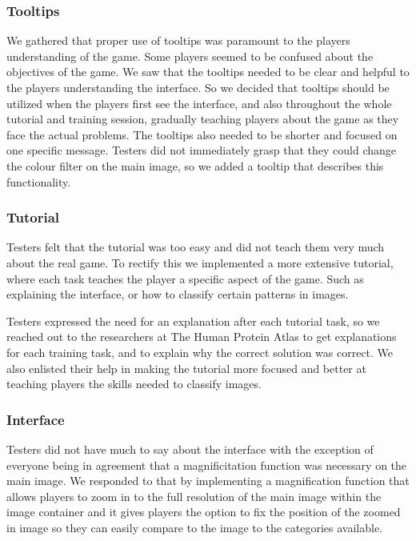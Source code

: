 \subsubsection{Tooltips}
We gathered that proper use of tooltips was paramount to the players understanding of the game. Some players seemed to be confused about the objectives of the game. We saw that the tooltips needed to be clear and helpful to the players understanding the interface. So we decided that tooltips should be utilized when the players first see the interface, and also throughout the whole tutorial and training session, gradually teaching players about the game as they face the actual problems. The tooltips also needed to be shorter and focused on one specific message. Testers did not immediately grasp that they could change the colour filter on the main image, so we added a tooltip that describes this functionality.

\subsubsection{Tutorial}
Testers felt that the tutorial was too easy and did not teach them very much about the real game. To rectify this we implemented a more extensive tutorial, where each task teaches the player a specific aspect of the game. Such as explaining the interface, or how to classify certain patterns in images. 

Testers expressed the need for an explanation after each tutorial task, so we reached out to the researchers at The Human Protein Atlas to get explanations for each training task, and to explain why the correct solution was correct. We also enlisted their help in making the tutorial more focused and better at teaching players the skills needed to classify images.

\subsubsection{Interface}
Testers did not have much to say about the interface with the exception of everyone being in agreement that a magnificitation function was necessary on the main image. We responded to that by implementing a magnification function that allows players to zoom in to the full resolution of the main image within the image container and it gives players the option to fix the position of the zoomed in image so they can easily compare to the image to the categories available.

